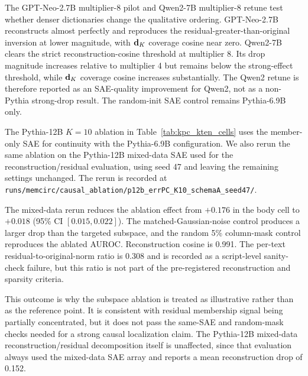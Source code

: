 The GPT-Neo-2.7B multiplier-8 pilot and Qwen2-7B multiplier-8 retune test whether denser dictionaries change the qualitative ordering. GPT-Neo-2.7B reconstructs almost perfectly and reproduces the residual-greater-than-original inversion at lower magnitude, with $\mathbf{d}_K$ coverage cosine near zero. Qwen2-7B clears the strict reconstruction-cosine threshold at multiplier 8. Its drop magnitude increases relative to multiplier 4 but remains below the strong-effect threshold, while $\mathbf{d}_K$ coverage cosine increases substantially. The Qwen2 retune is therefore reported as an SAE-quality improvement for Qwen2, not as a non-Pythia strong-drop result. The random-init SAE control remains Pythia-6.9B only.

The Pythia-12B $K=10$ ablation in Table~\ref{tab:kpc_kten_cells} uses the member-only SAE for continuity with the Pythia-6.9B configuration. We also rerun the same ablation on the Pythia-12B mixed-data SAE used for the reconstruction/residual evaluation, using seed 47 and leaving the remaining settings unchanged. The rerun is recorded at \texttt{runs/\allowbreak{}memcirc/\allowbreak{}causal\_\allowbreak{}ablation/\allowbreak{}p12b\_\allowbreak{}errPC\_\allowbreak{}K10\_\allowbreak{}schemaA\_\allowbreak{}seed47/\allowbreak{}}.

The mixed-data rerun reduces the ablation effect from $+0.176$ in the body cell to $+0.018$ (95\% CI $[0.015, 0.022]$). The matched-Gaussian-noise control produces a larger drop than the targeted subspace, and the random 5\% column-mask control reproduces the ablated AUROC. Reconstruction cosine is 0.991. The per-text residual-to-original-norm ratio is 0.308 and is recorded as a script-level sanity-check failure, but this ratio is not part of the pre-registered reconstruction and sparsity criteria.

This outcome is why the subspace ablation is treated as illustrative rather than as the reference point. It is consistent with residual membership signal being partially concentrated, but it does not pass the same-SAE and random-mask checks needed for a strong causal localization claim. The Pythia-12B mixed-data reconstruction/residual decomposition itself is unaffected, since that evaluation always used the mixed-data SAE array and reports a mean reconstruction drop of 0.152.

